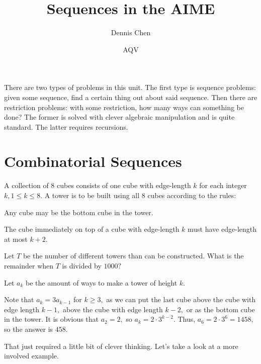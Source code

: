 \documentclass{article}
\title{Sequences in the AIME}
\author{Dennis Chen}
\date{AQV}
\begin{document}
\maketitle

There are two types of problems in this unit. The first type is sequence problems: given some sequence, find a certain thing out about said sequence. Then there are restriction problems: with some restriction, how many ways can something be done? The former is solved with clever algebraic manipulation and is quite standard. The latter requires recursions.

\section{Combinatorial Sequences}

\begin{exam}[AIME I 2006/11]
A collection of $8$ cubes consists of one cube with edge-length $k$ for each integer $k, 1 \le k \le 8.$ A tower is to be built using all $8$ cubes according to the rules:

\begin{itemize}

    \Item Any cube may be the bottom cube in the tower.

    \Item The cube immediately on top of a cube with edge-length $k$ must have edge-length at most $k+2.$

\end{itemize}

Let $T$ be the number of different towers than can be constructed. What is the remainder when $T$ is divided by $1000?$
\end{exam}
\begin{sol}
Let $a_k$ be the amount of ways to make a tower of height $k.$
    
Note that $a_k=3a_{k-1}$ for $k\geq 3,$ as we can put the last cube above the cube with edge length $k-1,$ above the cube with edge length $k-2,$ or as the bottom cube in the tower. It is obvious that $a_2=2,$ so $a_k=2\cdot 3^{k-2}.$ Thus, $a_6=2\cdot 3^6=1458,$ so the answer is $458.$
\end{sol}
That just required a little bit of clever thinking. Let's take a look at a more involved example.
\end{document}
